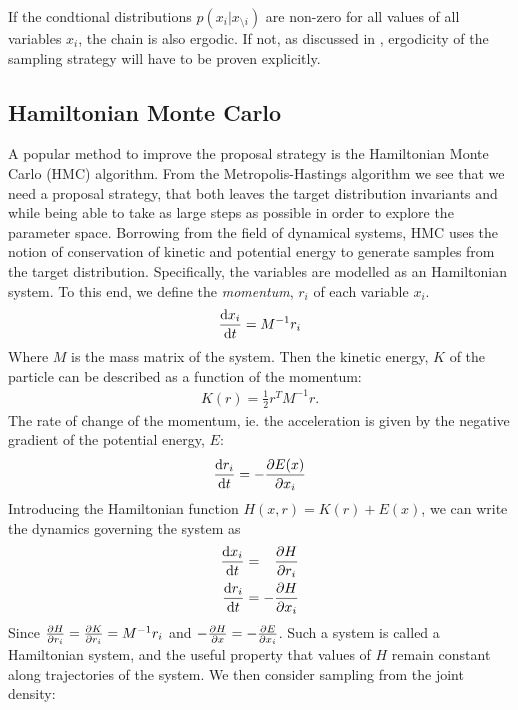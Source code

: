 If the condtional distributions $p(x_i|x_{\setminus i})$ are non-zero for all values of all variables $x_i$, the chain is also ergodic. If not, as discussed in \cite{bishop_pattern_2006}, ergodicity of the sampling strategy will have to be proven explicitly.

\subsection{Hamiltonian Monte Carlo}

A popular method to improve the proposal strategy is the Hamiltonian Monte Carlo (HMC) algorithm. 
From the Metropolis-Hastings algorithm we see that we need a proposal strategy, that both leaves the target distribution invariants and while being able to take as large steps as possible in order to explore the parameter space.
Borrowing from the field of dynamical systems, HMC uses the notion of conservation of kinetic and potential energy to generate samples from the target distribution. 
Specifically, the variables are modelled as an Hamiltonian system. To this end, we define the \emph{momentum}, $r_i$ of each variable $x_i$.
\begin{align*}
    \dv{x_i}{t} = M^{-1} r_i
\end{align*}
Where $M$ is the mass matrix of the system. Then the kinetic energy, $K$ of the particle can be described as a function of the momentum:
\begin{align*}
    K(r) = \frac{1}{2}r^T M^{-1} r.
\end{align*}
The rate of change of the momentum, ie. the acceleration is given by the negative gradient of the potential energy, $E$:
\begin{align*}
    \dv{r_i}{t} = -\pdv{E(x)}{x_i}
\end{align*}
Introducing the Hamiltonian function $H(x, r) = K(r) + E(x)$, we can write the dynamics governing the system as
\begin{equation}\label{eq:hmc-dynamics}
    \begin{aligned}
        \dv{x_i}{t} &= \phantom{-}\pdv{H}{r_i}\\
        \dv{r_i}{t} &= -\pdv{H}{x_i}
    \end{aligned}
\end{equation}
Since $\pdv{H}{r_i} = \pdv{K}{r_i} = M^{-1}r_i$ and $-\pdv{H}{x} = -\pdv{E}{x_i}$. 
Such a system is called a Hamiltonian system, and the useful property that values of $H$ remain constant along trajectories of the system.
We then consider sampling from the joint density:

